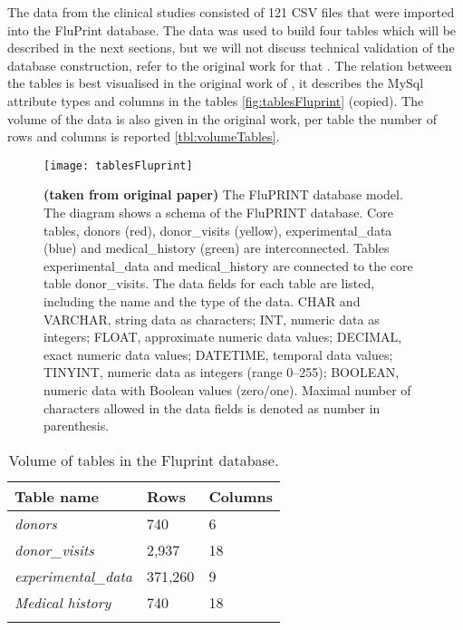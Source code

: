 The data from the clinical studies consisted of 121 CSV files that were
imported into the FluPrint database. The data was used to build four tables
which will be described in the next sections, but we will not discuss technical
validation of the database construction, refer to the original work for that
\citep{tomicFluPRINTDatasetMultidimensional2019}.  The relation between the
tables is best visualised in the original work of
\citep{tomicFluPRINTDatasetMultidimensional2019}, it describes the MySql
attribute types and columns in the tables \autoref{fig:tablesFluprint}
(copied). The volume of the data is also given in the original work, per table
the number of rows and columns is reported \autoref{tbl:volumeTables}.

\begin{figure}
    \texttt{[image: tablesFluprint]}
    \caption{
        \textbf{(taken from original paper)} The FluPRINT database model. The diagram shows a schema of the FluPRINT
    database. Core tables, donors (red), donor\_visits (yellow),
    experimental\_data (blue) and medical\_history (green) are interconnected.
    Tables experimental\_data and medical\_history are connected to the core
    table donor\_visits. The data fields for each table are listed, including
    the name and the type of the data. CHAR and VARCHAR, string data as
    characters; INT, numeric data as integers; FLOAT, approximate numeric data
    values; DECIMAL, exact numeric data values; DATETIME, temporal data values;
    TINYINT, numeric data as integers (range 0–255); BOOLEAN, numeric data with
    Boolean values (zero/one). Maximal number of characters allowed in the data
    fields is denoted as number in parenthesis.
    }\label{fig:tablesFluprint}
\end{figure}

\begin{table}
    \centering
    \begin{tabular}{lll}
        \toprule{}
        \textbf{Table name} & \textbf{Rows} & \textbf{Columns} \\
        \midrule{}
        \textit{donors} &  740 & 6 \\
        \textit{donor\_visits} & 2,937 & 18 \\
        \textit{experimental\_data} & 371,260 & 9 \\
        \textit{Medical history} & 740 & 18 \\
    \bottomrule{}
    \end{tabular}
    \caption{Volume of tables in the Fluprint database.}\label{tbl:volumeTables}
\end{table}


